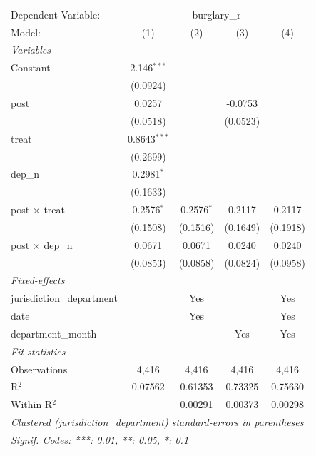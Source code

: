\begingroup
\centering
\begin{tabular}{lcccc}
   \tabularnewline \midrule \midrule
   Dependent Variable: & \multicolumn{4}{c}{burglary\_r}\\
   Model:                    & (1)            & (2)          & (3)      & (4)\\  
   \midrule
   \emph{Variables}\\
   Constant                  & 2.146$^{***}$  &              &          &   \\   
                             & (0.0924)       &              &          &   \\   
   post                      & 0.0257         &              & -0.0753  &   \\   
                             & (0.0518)       &              & (0.0523) &   \\   
   treat                     & 0.8643$^{***}$ &              &          &   \\   
                             & (0.2699)       &              &          &   \\   
   dep\_n                    & 0.2981$^{*}$   &              &          &   \\   
                             & (0.1633)       &              &          &   \\   
   post $\times$ treat       & 0.2576$^{*}$   & 0.2576$^{*}$ & 0.2117   & 0.2117\\   
                             & (0.1508)       & (0.1516)     & (0.1649) & (0.1918)\\   
   post $\times$ dep\_n      & 0.0671         & 0.0671       & 0.0240   & 0.0240\\   
                             & (0.0853)       & (0.0858)     & (0.0824) & (0.0958)\\   
   \midrule
   \emph{Fixed-effects}\\
   jurisdiction\_department  &                & Yes          &          & Yes\\  
   date                      &                & Yes          &          & Yes\\  
   department\_month         &                &              & Yes      & Yes\\  
   \midrule
   \emph{Fit statistics}\\
   Observations              & 4,416          & 4,416        & 4,416    & 4,416\\  
   R$^2$                     & 0.07562        & 0.61353      & 0.73325  & 0.75630\\  
   Within R$^2$              &                & 0.00291      & 0.00373  & 0.00298\\  
   \midrule \midrule
   \multicolumn{5}{l}{\emph{Clustered (jurisdiction\_department) standard-errors in parentheses}}\\
   \multicolumn{5}{l}{\emph{Signif. Codes: ***: 0.01, **: 0.05, *: 0.1}}\\
\end{tabular}
\par\endgroup
